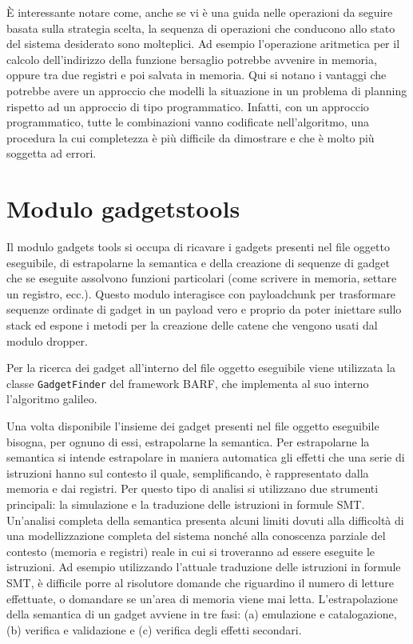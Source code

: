 È interessante notare come, anche se vi è una guida nelle operazioni
da seguire basata sulla strategia scelta, la sequenza di operazioni
che conducono allo stato del sistema desiderato sono molteplici. Ad
esempio l'operazione aritmetica per il calcolo dell'indirizzo della
funzione bersaglio potrebbe avvenire in memoria, oppure tra due
registri e poi salvata in memoria. Qui si notano i vantaggi che
potrebbe avere un approccio che modelli la situazione in un problema
di planning rispetto ad un approccio di tipo programmatico. Infatti,
con un approccio programmatico, tutte le combinazioni vanno codificate
nell'algoritmo, una procedura la cui completezza è più difficile da
dimostrare e che è molto più soggetta ad errori.

\section{Modulo gadgetstools}

Il modulo gadgets tools si occupa di ricavare i gadgets presenti nel
file oggetto eseguibile, di estrapolarne la semantica e della
creazione di sequenze di gadget che se eseguite assolvono funzioni
particolari (come scrivere in memoria, settare un registro,
ecc.). Questo modulo interagisce con payloadchunk per trasformare
sequenze ordinate di gadget in un payload vero e proprio da poter
iniettare sullo stack ed espone i metodi per la creazione delle catene
che vengono usati dal modulo dropper.

Per la ricerca dei gadget all'interno del file oggetto eseguibile
viene utilizzata la classe \lstinline{GadgetFinder} del framework
BARF, che implementa al suo interno l'algoritmo galileo\cite{roemer-12}. 


Una volta disponibile l'insieme dei gadget presenti nel file oggetto
eseguibile bisogna, per ognuno di essi, estrapolarne la semantica. Per
estrapolarne la semantica si intende estrapolare in maniera automatica
gli effetti che una serie di istruzioni hanno sul contesto il quale,
semplificando, è rappresentato dalla memoria e dai registri. Per
questo tipo di analisi si utilizzano due strumenti principali: la
simulazione e la traduzione delle istruzioni in formule
SMT. Un'analisi completa della semantica presenta alcuni limiti dovuti
alla difficoltà di una modellizzazione completa del sistema nonché
alla conoscenza parziale del contesto (memoria e registri) reale in
cui si troveranno ad essere eseguite le istruzioni. Ad esempio
utilizzando l'attuale traduzione delle istruzioni in formule SMT, è
difficile porre al risolutore domande che riguardino il numero di
letture effettuate, o domandare se un'area di memoria viene mai
letta. L'estrapolazione della semantica di un gadget avviene in tre
fasi: (a) emulazione e catalogazione, (b) verifica e validazione e
(c) verifica degli effetti secondari.

